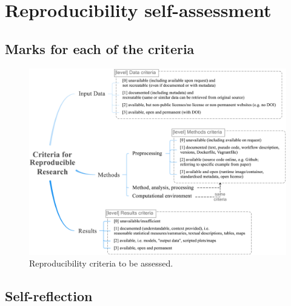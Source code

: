 

\chapter{Reproducibility self-assessment}

\section{Marks for each of the criteria}

\begin{figure}[h]
  \centering
  \includegraphics[width=0.8\linewidth]{figs/reproducibility_criteria.png}
  \caption{Reproducibility criteria to be assessed.}
\label{fig:reproducibility_criteria}
\end{figure}



\section{Self-reflection} 



